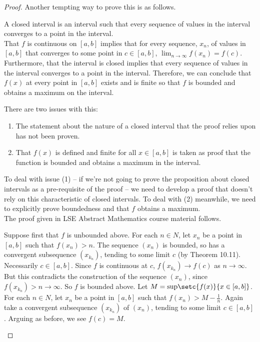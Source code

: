 \documentclass[../MathsNotesBase.tex]{subfiles}
\begin{document}
{\begin{proof}
			Another tempting way to prove this is as follows.\\
			
			\begin{displayquote}
			A closed interval is an interval such that every sequence of values in the interval converges to a point in the interval.\\ 
			That $f$ is continuous on ${ [a,b] }$ implies that for every sequence, $x_n$, of values in ${ [a,b] }$ that converges to some point in ${ c \in [a,b] }$, ${ \lim_{n \to \infty} f(x_n) = f(c) }$. Furthermore, that the interval is closed implies that every sequence of values in the interval converges to a point in the interval. Therefore, we can conclude that $f(x)$ at every point in ${ [a,b] }$ exists and is finite so that $f$ is bounded and obtains a maximum on the interval.\\
			\end{displayquote}
			
			There are two issues with this:
			\begin{enumerate}
				\item{The statement about the nature of a closed interval that the proof relies upon has not been proven.}
				\item{That $f(x)$ is defined and finite for all ${ x \in [a,b] }$ is taken as proof that the function is bounded and obtains a maximum in the interval.}
			\end{enumerate}
			To deal with issue (1) -- if we're not going to prove the proposition about closed intervals as a pre-requisite of the proof -- we need to develop a proof that doesn't rely on this characteristic of closed intervals. To deal with (2) meanwhile, we need to explicitly prove boundedness and that $f$ obtains a maximum.\\
			The proof given in LSE Abstract Mathematics course material follows.\\
			
			\begin{displayquote}
			Suppose first that $ f $ is unbounded above. For each ${ n \in N }$, let $ x_n $ be a point in ${ [a, b] }$ such that ${ f(x_n) > n }$. The sequence $ (x_n) $ is bounded, so has a convergent subsequence ${ (x_{k_n}) }$, tending to some limit $ c $ (by Theorem 10.11). Necessarily ${ c \in [a, b] }$. Since $ f $ is continuous at $ c $, ${ f(x_{k_n}) \to f(c) }$ as ${ n \to \infty }$. But this contradicts the construction of the sequence $ (x_n) $, since ${ f(x_{k_n}) > n \to \infty }$. So $ f $ is bounded above. Let ${ M = \text{sup}\setc{f(x)}{x \in [a, b]} }$. For each ${ n \in N }$, let $ x_n $ be a point in ${ [a, b] }$ such that ${ f(x_n) > M - \frac{1}{n} }$. Again take a convergent subsequence ${ (x_{k_n}) }$ of $ (x_n) $, tending to some limit ${ c \in [a, b] }$. Arguing as before, we see ${ f(c) = M }$.
			\end{displayquote}
		

\end{proof}}
\end{document}
